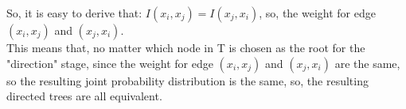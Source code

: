 \begin{enumerate}
\begin{enumerate}
So, it is easy to derive that: $I(x_i, x_j) = I(x_j, x_i)$, so, the weight for edge $(x_i, x_j)$ and $(x_j, x_i)$. \\

This means that, no matter which node in T is chosen as the root for the "direction" stage, since the weight for edge $(x_i, x_j)$ and $(x_j, x_i)$ are the same, so the resulting joint probability distribution is the same, so, the resulting directed trees are all equivalent.\\

\end{enumerate}

\end{enumerate}



